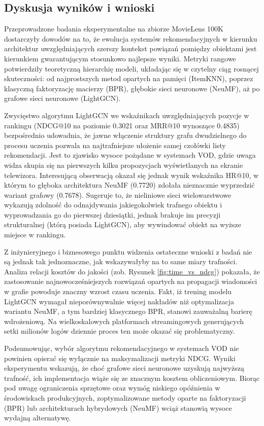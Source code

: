 \subsection{Dyskusja wyników i wnioski}

Przeprowadzone badania eksperymentalne na zbiorze MovieLens 100K dostarczyły dowodów na to, że ewolucja systemów rekomendacyjnych w kierunku architektur uwzględniających szerszy kontekst powiązań pomiędzy obiektami jest kierunkiem gwarantującym stosunkowo najlepsze wyniki. Metryki rangowe potwierdziły teoretyczną hierarchię modeli, układając się w czytelny ciąg rosnącej skuteczności: od najprostszych metod opartych na pamięci (ItemKNN), poprzez klasyczną faktoryzację macierzy (BPR), głębokie sieci neuronowe (NeuMF), aż po grafowe sieci neuronowe (LightGCN).

Zwycięstwo algorytmu LightGCN we wskaźnikach uwzględniających pozycje w rankingu (NDCG@10 na poziomie 0.3021 oraz MRR@10 wynoszące 0.4835) bezpośrednio udowadnia, że jawne włączenie struktury grafu dwudzielnego do procesu uczenia pozwala na najtrafniejsze ułożenie samej czołówki listy rekomendacji. Jest to zjawisko wysoce pożądane w systemach VOD, gdzie uwaga widza skupia się na pierwszych kilku propozycjach wyświetlanych na ekranie telewizora. Interesującą obserwacją okazał się jednak wynik wskaźnika HR@10, w którym to głęboka architektura NeuMF (0.7720) zdołała nieznacznie wyprzedzić wariant grafowy (0.7678). Sugeruje to, że nieliniowe sieci wielowarstwowe wykazują zdolność do odnajdywania jakiegokolwiek trafnego obiektu i wyprowadzania go do pierwszej dziesiątki, jednak brakuje im precyzji strukturalnej (którą posiada LightGCN), aby wywindować obiekt na wyższe miejsce w rankingu.

Z inżynieryjnego i biznesowego punktu widzenia ostateczne wnioski z badań nie są jednak tak jednoznaczne, jak wskazywałyby na to same miary trafności. Analiza relacji kosztów do jakości (zob. Rysunek \ref{fig:time_vs_ndcg}) pokazała, że zastosowanie najnowocześniejszych rozwiązań opartych na propagacji wiadomości w grafie powoduje znaczny wzrost czasu uczenia. Fakt, iż trening modelu LightGCN wymagał nieporównywalnie więcej nakładów niż optymalizacja wariantu NeuMF, a tym bardziej klasycznego BPR, stanowi zauważalną barierę wdrożeniową. Na wielkoskalowych platformach streamingowych generujących setki milionów logów dziennie proces ten może okazać się problematyczny.

Podsumowując, wybór algorytmu rekomendacyjnego w systemach VOD nie powinien opierać się wyłącznie na maksymalizacji metryki NDCG. Wyniki eksperymentu wskazują, że choć grafowe sieci neuronowe uzyskują najwyższą trafność, ich implementacja wiąże się ze znacznym kosztem obliczeniowym. Biorąc pod uwagę ograniczenia sprzętowe oraz wymóg niskiego opóźnienia w środowiskach produkcyjnych, zoptymalizowane metody oparte na faktoryzacji (BPR) lub architekturach hybrydowych (NeuMF) wciąż stanowią wysoce wydajną alternatywę.